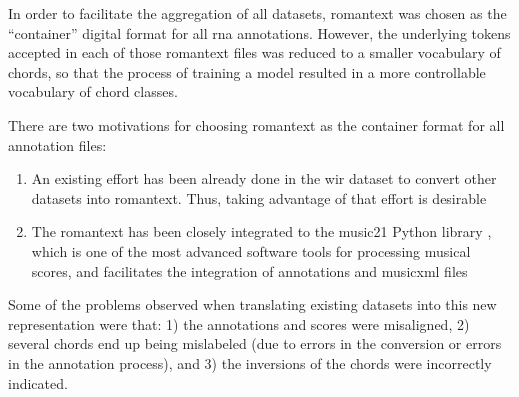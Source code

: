 
In order to facilitate the aggregation of all datasets,
\gls{romantext} was chosen as the ``container'' digital
format for all \gls{rna} annotations. However, the
underlying tokens accepted in each of those \gls{romantext}
files was reduced to a smaller vocabulary of chords, so that
the process of training a model resulted in a more
controllable vocabulary of chord classes.

There are two motivations for choosing \gls{romantext} as
the container format for all annotation files:

\begin{enumerate}
    \item An existing effort has been already done in the
    \gls{wir} dataset \parencite{gotham2019romantext,
    gotham2022openscore} to convert other datasets into
    \gls{romantext}. Thus, taking advantage of that effort
    is desirable
    \item The \gls{romantext} has been closely integrated to
    the music21 Python library
    \parencite{cuthbert2010music21}, which is one of the
    most advanced software tools for processing musical
    scores, and facilitates the integration of annotations
    and \gls{musicxml} files
\end{enumerate}

Some of the problems observed when translating existing
datasets into this new representation were that: 1) the
annotations and scores were misaligned, 2) several chords
end up being mislabeled (due to errors in the conversion or
errors in the annotation process), and 3) the inversions of
the chords were incorrectly indicated.